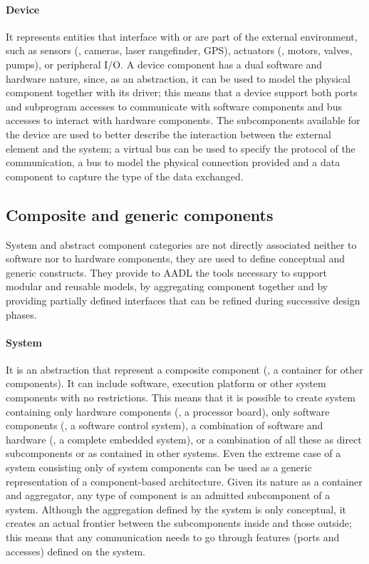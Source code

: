 \paragraph{Device} It represents entities that interface with or are part of the external environment, such as sensors (\eg, cameras, laser rangefinder, GPS), actuators (\eg, motors, valves, pumps), or peripheral I/O. A device component has a dual software and hardware nature, since, as an abstraction, it can be used to model the physical component together with its driver; this means that a device support both ports and subprogram accesses to communicate with software components and bus accesses to interact with hardware components. The subcomponents available for the device are used to better describe the interaction between the external element and the system; a virtual bus can be used to specify the protocol of the communication, a bus to model the physical connection provided and a data component to capture the type of the data exchanged.

\subsection{Composite and generic components}
System and abstract component categories are not directly associated neither to software nor to hardware components, they are used to define conceptual and generic constructs. They provide to AADL the tools necessary to support modular and reusable models, by aggregating component together and by providing partially defined interfaces that can be refined during successive design phases.

\paragraph{System} It is an abstraction that represent a composite component (\ie, a container for other components). It can include software, execution platform or other system components with no restrictions. This means that it is possible to create system containing only hardware components (\eg, a processor board), only software components (\eg, a software control system), a combination of software and hardware (\eg, a complete embedded system),  or a combination of all these as direct subcomponents or as contained in other systems. Even the extreme case of a system consisting only of system components can be used as a generic representation of a component-based architecture. Given its nature as a container and aggregator, any type of component is an admitted subcomponent of a system. Although the aggregation defined by the system is only conceptual, it creates an actual frontier between the subcomponents inside and those outside; this means that any communication needs to go through features (\ie ports and accesses) defined on the system.

